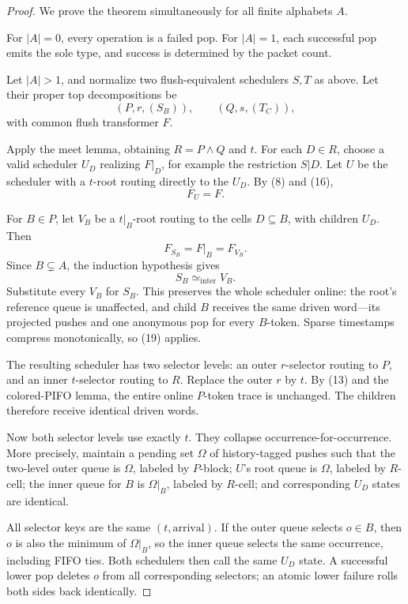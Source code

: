\documentclass[11pt]{article}
\begin{document}
\begin{proof}
We prove the theorem simultaneously for all finite alphabets $A$.

For $|A|=0$, every operation is a failed pop.  For $|A|=1$, each successful pop emits the sole type, and success is determined by the packet count.

Let $|A|>1$, and normalize two flush-equivalent schedulers $S,T$ as above.  Let their proper top decompositions be
\[
(P,r,(S_B)),\qquad (Q,s,(T_C)),
\]
with common flush transformer $F$.

Apply the meet lemma, obtaining $R=P\wedge Q$ and $t$.  For each $D\in R$, choose a valid scheduler $U_D$ realizing $F|_D$, for example the restriction $S|D$.  Let $U$ be the scheduler with a $t$-root routing directly to the $U_D$.  By (8) and (16),
\begin{equation}
F_U=F.
\tag{17}
\end{equation}

For $B\in P$, let $V_B$ be a $t|_B$-root routing to the cells $D\subseteq B$, with children $U_D$.  Then
\begin{equation}
F_{S_B}=F|_B=F_{V_B}.
\tag{18}
\end{equation}
Since $B\subsetneq A$, the induction hypothesis gives
\begin{equation}
S_B\simeq_{\mathrm{inter}}V_B.
\tag{19}
\end{equation}
Substitute every $V_B$ for $S_B$.  This preserves the whole scheduler online: the root's reference queue is unaffected, and child $B$ receives the same driven word---its projected pushes and one anonymous pop for every $B$-token.  Sparse timestamps compress monotonically, so (19) applies.

The resulting scheduler has two selector levels: an outer $r$-selector routing to $P$, and an inner $t$-selector routing to $R$.  Replace the outer $r$ by $t$.  By (13) and the colored-PIFO lemma, the entire online $P$-token trace is unchanged.  The children therefore receive identical driven words.

Now both selector levels use exactly $t$.  They collapse occurrence-for-occurrence.  More precisely, maintain a pending set $\Omega$ of history-tagged pushes such that the two-level outer queue is $\Omega$, labeled by $P$-block; $U$'s root queue is $\Omega$, labeled by $R$-cell; the inner queue for $B$ is $\Omega|_B$, labeled by $R$-cell; and corresponding $U_D$ states are identical.

All selector keys are the same $(t,\text{arrival})$.  If the outer queue selects $o\in B$, then $o$ is also the minimum of $\Omega|_B$, so the inner queue selects the same occurrence, including FIFO ties.  Both schedulers then call the same $U_D$ state.  A successful lower pop deletes $o$ from all corresponding selectors; an atomic lower failure rolls both sides back identically.


\end{proof}
\end{document}
